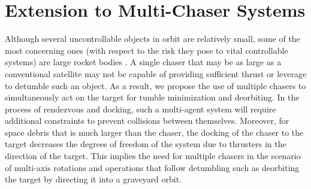 \section{Extension to Multi-Chaser Systems}
\label{sec:multi-agent}
Although several uncontrollable objects in orbit are relatively small, some of the most concerning ones (with respect to the risk they pose to vital controllable systems) are large rocket bodies \cite{mcknight2021identifying}.
A single chaser that may be as large as a conventional satellite may not be capable of providing sufficient thrust or leverage to detumble such an object.
As a result, we propose the use of multiple chasers to simultaneously act on the target for tumble minimization and deorbiting.
In the process of rendezvous and docking, such a multi-agent system will require additional constraints to prevent collisions between themselves.
Moreover, for space debris that is much larger than the chaser, the docking of the chaser to the target decreases the degrees of freedom of the system due to thrusters in the direction of the target.
This implies the need for multiple chasers in the scenario of multi-axis rotations and operations that follow detumbling such as deorbiting the target by directing it into a graveyard orbit.

